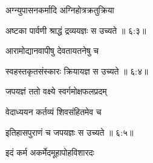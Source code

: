 
{\devanagarifont अग्न्युपासनकर्मादि अग्निहोत्रक्रतुक्रिया \thinspace{\dandab} \dontdisplaylinenum }%


{\devanagarifont अष्टका पार्वणी श्राद्धं द्रव्ययज्ञः स उच्यते {॥ ६:३॥} \veg\dontdisplaylinenum }%



{\devanagarifont आरामोद्यानवापीषु देवतायतनेषु च \thinspace{\dandab} \dontdisplaylinenum }%


{\devanagarifont स्वहस्तकृतसंस्कारः क्रियायज्ञ स उच्यते {॥ ६:४॥} \veg\dontdisplaylinenum }%



{\devanagarifont जपयज्ञं ततो वक्ष्ये स्वर्गमोक्षफलप्रदम् \thinspace{\dandab} \dontdisplaylinenum }%

{\devanagarifont वेदाध्ययन कर्तव्यं शिवसंहितमेव च  \danda\dontdisplaylinenum }%


{\devanagarifont इतिहासपुराणं च जपयज्ञः स उच्यते {॥ ६:५॥} \veg\dontdisplaylinenum }%



{\devanagarifont इदं कर्म अकर्मेदमूहापोहविशारदः \thinspace{\dandab} \dontdisplaylinenum }%

